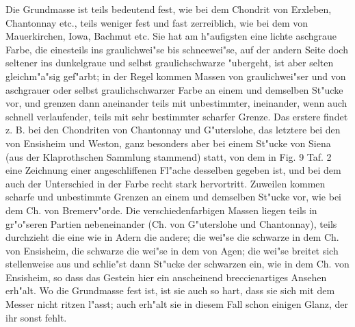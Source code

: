 \documentclass[a4paper, 11pt, oneside]{article}
\begin{document}
Die Grundmasse ist teils bedeutend fest, wie bei dem Chondrit von Erxleben, Chantonnay etc., teils weniger fest und fast zerreiblich, wie bei dem von Mauerkirchen, Iowa, Bachmut etc. Sie hat am h"aufigsten eine lichte aschgraue Farbe, die einesteils ins graulichwei"se bis schneewei"se, auf der andern Seite doch seltener ins dunkelgraue und selbst graulichschwarze "ubergeht, ist aber selten gleichm"a"sig gef"arbt; in der Regel kommen Massen von graulichwei"ser und von aschgrauer oder selbst graulichschwarzer Farbe an einem und demselben St"ucke vor, und grenzen dann aneinander teils mit unbestimmter, ineinander, wenn auch schnell verlaufender, teils mit sehr bestimmter scharfer Grenze. Das erstere findet z. B. bei den Chondriten von Chantonnay und G"uterslohe, das letztere bei den von Ensisheim und Weston, ganz besonders aber bei einem St"ucke von Siena (aus der Klaprothschen Sammlung stammend) statt, von dem in Fig. 9 Taf. 2 eine Zeichnung einer angeschliffenen Fl"ache desselben gegeben ist, und bei dem auch der Unterschied in der Farbe recht stark hervortritt. Zuweilen kommen scharfe und unbestimmte Grenzen an einem und demselben St"ucke vor, wie bei dem Ch. von Bremerv"orde. Die verschiedenfarbigen Massen liegen teils in gr"o"seren Partien nebeneinander (Ch. von G"uterslohe und Chantonnay), teils durchzieht die eine wie in Adern die andere; die wei"se die schwarze in dem Ch. von Ensisheim, die schwarze die wei"se in dem von Agen; die wei"se breitet sich stellenweise aus und schlie"st dann St"ucke der schwarzen ein, wie in dem Ch. von Ensisheim, so dass das Gestein hier ein anscheinend breccienartiges Ansehen erh"alt. Wo die Grundmasse fest ist, ist sie auch so hart, dass sie sich mit dem Messer nicht ritzen l"asst; auch erh"alt sie in diesem Fall schon einigen Glanz, der ihr sonst fehlt.
\end{document}
